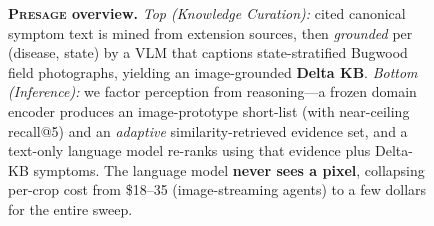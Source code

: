 \begin{figure}[t]
{\begin{tikzpicture}
\end{tikzpicture}
}%
\caption{\textbf{\textsc{Presage} overview.} \emph{Top (Knowledge Curation):}
cited canonical symptom text is mined from extension sources, then
\emph{grounded} per (disease, state) by a VLM that captions state-stratified
Bugwood field photographs, yielding an image-grounded \textbf{Delta KB}.
\emph{Bottom (Inference):} we factor perception from reasoning---a frozen
domain encoder produces an image-prototype short-list (with near-ceiling
recall@5) and an \emph{adaptive} similarity-retrieved evidence set, and a
text-only language model re-ranks using that evidence plus Delta-KB symptoms.
The language model \textbf{never sees a pixel}, collapsing per-crop cost from
\$18--35 (image-streaming agents) to a few dollars for the entire sweep.}
\label{fig:teaser}
\end{figure}
